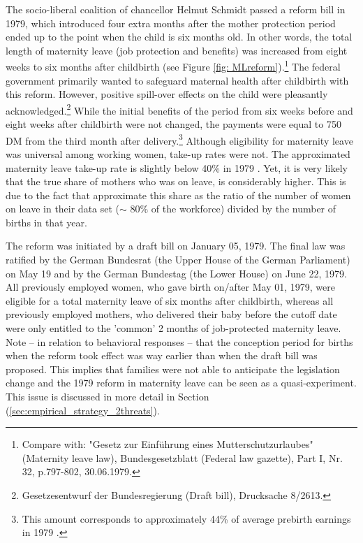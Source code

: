 \documentclass[11pt, a4paper,draft]{article} %
\begin{document}
The socio-liberal coalition of chancellor Helmut Schmidt passed a reform bill in 1979, which introduced four extra months after the mother protection period ended up to the point when the child is six months old. In other words, the total length of maternity leave (job protection and benefits) was increased from eight weeks to six months after childbirth (see Figure \ref{fig: MLreform}).\footnote{Compare with: "Gesetz zur Einführung eines Mutterschutzurlaubes" (Maternity leave law), Bundesgesetzblatt (Federal law gazette), Part I, Nr. 32, p.797-802, 30.06.1979.} The federal government primarily wanted to safeguard maternal health after childbirth with this reform. However, positive spill-over effects on the child were pleasantly acknowledged.\footnote{Gesetzesentwurf der Bundesregierung (Draft bill), Drucksache 8/2613.} While the initial benefits of the period from six weeks before and eight weeks after childbirth were not changed, the payments were equal to 750 DM from the third month after delivery.\footnote{This amount corresponds to approximately 44\% of average prebirth earnings in 1979 \citep{schonberg2014expansions}.} Although eligibility for maternity leave was universal among working women, take-up rates were not. The approximated maternity leave take-up rate is slightly below 40\% in 1979 \citep{Dustmann2012}. Yet, it is very likely that the true share of mothers who was on leave, is considerably higher. This is due to the fact that \cite{Dustmann2012} approximate this share as the ratio of the number of women on leave in their data set ($\sim$ 80\% of the workforce) divided by the number of births in that year.
\newline

The reform was initiated by a draft bill on January 05, 1979. The final law was ratified by the German Bundesrat (the Upper House of the German Parliament) on May 19 and by the German Bundestag (the Lower House) on June 22, 1979.  All previously employed women, who gave birth on/after May 01, 1979, were eligible for a total maternity leave of six months after childbirth, whereas all previously employed mothers, who delivered their baby before the cutoff date were only entitled to the 'common' 2 months of job-protected maternity leave. Note -- in relation to behavioral responses -- that the conception period for births when the reform took effect was way earlier than when the draft bill was proposed. This implies that families were not able to anticipate the legislation change and the 1979 reform in maternity leave can be seen as a quasi-experiment. This issue is discussed in more detail in Section (\ref{sec:empirical_strategy_2threats}).\newline
\end{document}
